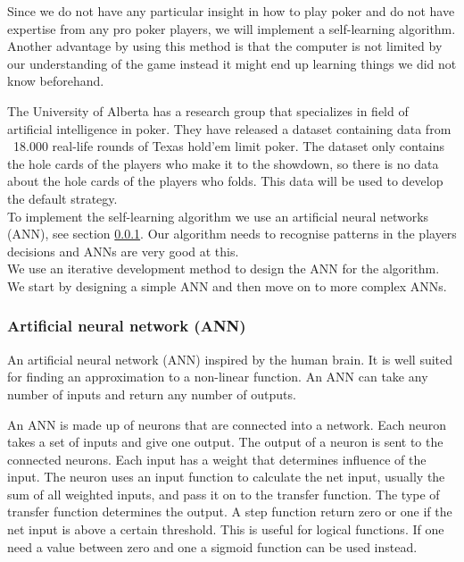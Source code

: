 Since we do not have any particular insight in how to play poker and do not have expertise from any pro poker players, we will implement a self-learning algorithm. Another advantage by using this method is that the computer is not limited by our understanding of the game instead it might end up learning things we did not know beforehand.

The University of Alberta has a research group that specializes in field of artificial intelligence in poker. They have released a dataset containing data from ~18.000 real-life rounds of Texas hold'em limit poker. The dataset only contains the hole cards of the players who make it to the showdown, so there is no data about the hole cards of the players who folds. This data will be used to develop the default strategy.\\

To implement the self-learning algorithm we use an artificial neural networks (ANN), see section \ref{sec:nn}. Our algorithm needs to recognise patterns in the players decisions and ANNs are very good at this. \\

We use an iterative development method to design the ANN for the algorithm. We start by designing a simple ANN and then move on to more complex ANNs.

\subsubsection{Artificial neural network (ANN)}
\label{sec:nn}
An artificial neural network (ANN) inspired by the human brain. It is well suited for finding an approximation to a non-linear function. An ANN can take any number of inputs and return any number of outputs. 

An ANN is made up of neurons that are connected into a network. Each neuron takes a set of inputs and give one output. The output of a neuron is sent to the connected neurons. Each input has a weight that determines influence of the input. The neuron uses an input function to calculate the net input, usually the sum of all weighted inputs, and pass it on to the transfer function. The type of transfer function determines the output. A step function return zero or one if the net input is above a certain threshold. This is useful for logical functions. If one need a value between zero and one a sigmoid function can be used instead.

